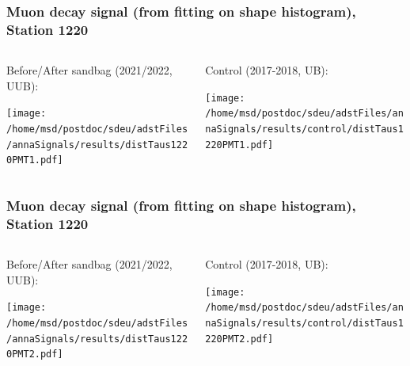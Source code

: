 \documentclass[aspectratio=169]{beamer}
\begin{document}
\begin{frame}
  \frametitle{Muon decay signal (from fitting on shape histogram), Station 1220}
  
  \begin{columns}[T,c]
    \begin{column}{.5\textwidth}
      Before/After sandbag (2021/2022, UUB):
      \vspace{.3cm}

      \texttt{[image: /home/msd/postdoc/sdeu/adstFiles/annaSignals/results/distTaus1220PMT1.pdf]}
    \end{column}
    \begin{column}{.5\textwidth}
      Control (2017-2018, UB):
      \vspace{0.3cm}

      \texttt{[image: /home/msd/postdoc/sdeu/adstFiles/annaSignals/results/control/distTaus1220PMT1.pdf]}
    \end{column}
  \end{columns}
\end{frame}

\begin{frame}
  \frametitle{Muon decay signal (from fitting on shape histogram), Station 1220}
  
  \begin{columns}[T,c]
    \begin{column}{.5\textwidth}
      Before/After sandbag (2021/2022, UUB):
      \vspace{.3cm}

      \texttt{[image: /home/msd/postdoc/sdeu/adstFiles/annaSignals/results/distTaus1220PMT2.pdf]}
    \end{column}
    \begin{column}{.5\textwidth}
      Control (2017-2018, UB):
      \vspace{0.3cm}

      \texttt{[image: /home/msd/postdoc/sdeu/adstFiles/annaSignals/results/control/distTaus1220PMT2.pdf]}
    \end{column}    
\end{columns}
\end{frame}
\end{document}
